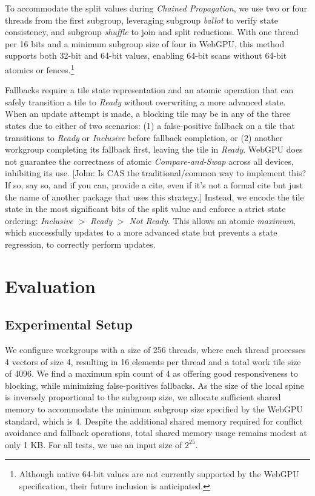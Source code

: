 \documentclass[sigconf]{acmart}
\newcommand{\john}[1]{{\footnotesize\color{cyan}[John: #1]}}
\begin{document}
To accommodate the split values during \emph{Chained Propagation}, we use two or four threads from the first subgroup, leveraging subgroup \emph{ballot} to verify state consistency, and subgroup \emph{shuffle} to join and split reductions. With one thread per 16 bits and a minimum subgroup size of four in WebGPU, this method supports both 32-bit and 64-bit values, enabling 64-bit scans without 64-bit atomics or fences.\footnote{Although native 64-bit values are not currently supported by the WebGPU specification, their future inclusion is anticipated.}

Fallbacks require a tile state representation and an atomic operation that can safely transition a tile to \emph{Ready} without overwriting a more advanced state. When an update attempt is made, a blocking tile may be in any of the three states due to either of two scenarios: (1) a false-positive fallback on a tile that transitions to \emph{Ready} or \emph{Inclusive} before fallback completion, or (2) another workgroup completing its fallback first, leaving the tile in \emph{Ready}. WebGPU does not guarantee the correctness of atomic \emph{Compare-and-Swap} across all devices, inhibiting its use. \john{Is CAS the traditional/common way to implement this? If so, say so, and if you can, provide a cite, even if it's not a formal cite but just the name of another package that uses this strategy.} Instead, we encode the tile state in the most significant bits of the split value and enforce a strict state ordering: \emph{Inclusive} $>$ \emph{Ready} $>$ \emph{Not Ready}. This allows an atomic \emph{maximum}, which successfully updates to a more advanced state but prevents a state regression, to correctly perform updates.

\section{Evaluation}
\subsection{Experimental Setup}
We configure workgroups with a size of 256 threads, where each thread processes 4 vectors of size 4, resulting in 16 elements per thread and a total work tile size of 4096. We find a maximum spin count of 4 as offering good responsiveness to blocking, while minimizing false-positives fallbacks. As the size of the local spine is inversely proportional to the subgroup size, we allocate sufficient shared memory to accommodate the minimum subgroup size specified by the WebGPU standard, which is 4. Despite the additional shared memory required for conflict avoidance and fallback operations, total shared memory usage remains modest at only 1 KB. For all tests, we use an input size of $2^{25}$.
\end{document}
